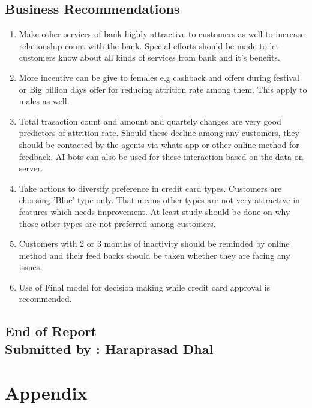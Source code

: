\documentclass[10pt,a4paper]{style}
\begin{document}
\subsection{Business Recommendations}
\begin{enumerate}
	\setlength\itemsep{-1pt}
	\item Make other services of bank highly attractive to customers as well to increase relationship count with the bank. Special efforts should be made to let customers know about all kinds of services from bank and it's benefits.
	\item More incentive can be give to females e.g cashback and offers during festival or Big billion days offer for reducing attrition rate among them. This apply to males as well.
	\item Total trasaction count and amount and quartely changes are very good predictors of attrition rate. Should these decline among any customers, they should be contacted by the agents via whats app or other online method for feedback. AI bots can also be used for these interaction based on the data on server.
	\item Take actions to diversify preference in credit card types. Customers are choosing 'Blue' type only. That means other types are not very attractive in features which needs improvement. At least study should be done on why those other types are not preferred among customers.
	\item Customers with 2 or 3 months of inactivity should be reminded by online method and their feed backs should be taken whether they are facing any issues.
	\item Use of Final model for decision making while credit card approval is recommended. 
\end{enumerate}
\begin{centering}
	\vspace{20pt}
	\subsection*{End of Report\\Submitted by : Haraprasad Dhal}
\end{centering}
\newpage
\section{Appendix}
\end{document}
